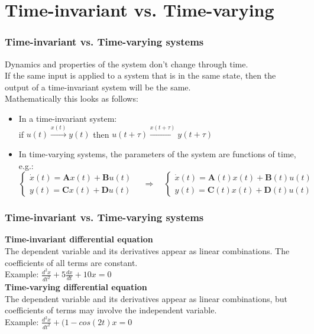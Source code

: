 \documentclass{beamer}
\begin{document}
\section{Time-invariant vs. Time-varying} 

\begin{frame}
\frametitle{Time-invariant vs. Time-varying systems}
Dynamics and properties of the system don't change through time.\\
If the same input is applied to a system that is in the same state, then the output of a time-invariant system will be the same.\\
\bigskip
Mathematically this looks as follows:\\
\begin{itemize}
\item In a time-invariant system:\\
if $u(t) \xrightarrow{x(t)} y(t)$ then $u(t+\tau) \xrightarrow{x(t+\tau)} y(t+\tau)$
\medskip
\item In time-varying systems, the parameters of the system are functions of time, e.g.:\\
\vspace{-2ex}
\begin{equation*}
\begin{cases}
             \dot{x}(t) = \textbf{A}x(t) + \textbf{B}u(t)\\
             y(t) = \textbf{C}x(t) + \textbf{D}u(t)
       \end{cases} \quad
\Rightarrow \quad
\begin{cases}
            \dot{x}(t) = \textbf{A}(t)x(t) + \textbf{B}(t)u(t)\\
             y(t) = \textbf{C}(t)x(t) + \textbf{D}(t)u(t)
       \end{cases}
\end{equation*}
\end{itemize}
\end{frame}


\begin{frame}
\frametitle{Time-invariant vs. Time-varying systems}
\textbf{Time-invariant differential equation}\\
\medskip
The dependent variable and its derivatives appear as linear combinations. The coefficients of all terms are constant.\\
Example: $\frac{d^{2}x}{dt^{2}} + 5\frac{dx}{dt} + 10x=0$\\
\bigskip
\bigskip
\textbf{Time-varying differential equation}\\
\medskip
The dependent variable and its derivatives appear as linear combinations, but coefficients of terms may involve the independent variable.\\
Example: $\frac{d^{2}x}{dt^{2}} + (1-cos(2t)x = 0$
\end{frame}
\end{document}
